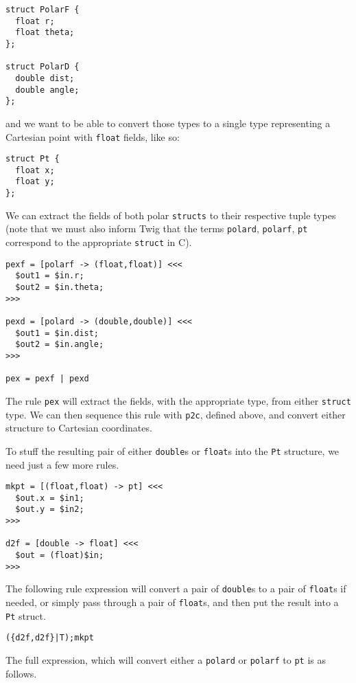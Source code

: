 \begin{verbatim}
struct PolarF {
  float r;
  float theta;
};

struct PolarD {
  double dist;
  double angle;
};
\end{verbatim}

and we want to be able to convert those types to a single type representing a Cartesian point with \texttt{float} fields, like so:

\begin{verbatim}
struct Pt {
  float x;
  float y;
};
\end{verbatim}

We can extract the fields of both polar \texttt{structs} to their respective tuple types (note that we must also inform Twig that the terms \texttt{polard}, \texttt{polarf}, \texttt{pt} correspond to the appropriate \texttt{struct} in C).

\begin{verbatim}
pexf = [polarf -> (float,float)] <<<
  $out1 = $in.r;
  $out2 = $in.theta;
>>>

pexd = [polard -> (double,double)] <<<
  $out1 = $in.dist;
  $out2 = $in.angle;
>>>

pex = pexf | pexd
\end{verbatim}

The rule \texttt{pex} will extract the fields, with the appropriate type, from either \texttt{struct} type. We can then sequence this rule with \texttt{p2c}, defined above, and convert either structure to Cartesian coordinates.

To stuff the resulting pair of either \texttt{double}s or \texttt{float}s into the \texttt{Pt} structure, we need just a few more rules. 

\begin{verbatim}
mkpt = [(float,float) -> pt] <<<
  $out.x = $in1;
  $out.y = $in2;
>>>

d2f = [double -> float] <<<
  $out = (float)$in;
>>>
\end{verbatim}

The following rule expression will convert a pair of \texttt{double}s to a pair of \texttt{float}s if needed, or simply pass through a pair of \texttt{float}s, and then put the result into a \texttt{Pt} struct.

\begin{verbatim}
({d2f,d2f}|T);mkpt
\end{verbatim}

The full expression, which will convert either a \texttt{polard} or \texttt{polarf} to \texttt{pt} is as follows.

